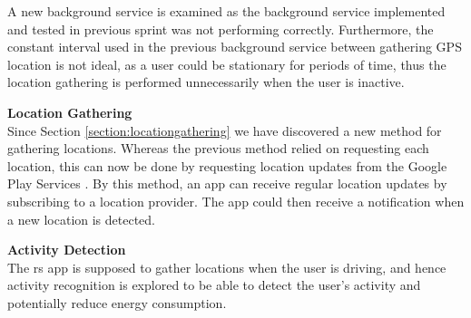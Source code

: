 A new background service is examined as the background service implemented and tested in previous sprint was not performing correctly.
Furthermore, the constant interval used in the previous background service between gathering GPS location is not ideal, as a user could be stationary for periods of time, thus the location gathering is performed unnecessarily when the user is inactive.

\textbf{Location Gathering}\\
Since Section \ref{section:locationgathering} we have discovered a new method for gathering locations. 
Whereas the previous method relied on requesting each location, this can now be done by requesting location updates from the Google Play Services \cite{receivingLocationUpdates}.
By this method, an app can receive regular location updates by subscribing to a location provider.
The app could then receive a notification when a new location is detected.

\textbf{Activity Detection}\\
The \gls{rs} app is supposed to gather locations when the user is driving, and hence activity recognition is explored to be able to detect the user's activity and potentially reduce energy consumption.
